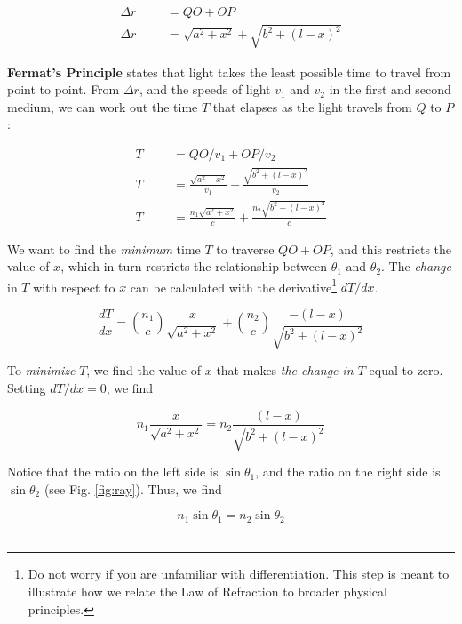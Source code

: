 \documentclass[12pt,twocolumn]{article}
\begin{document}
\begin{align}
\Delta r & & &= QO +OP \\
\Delta r & & &= \sqrt{a^2+x^2} + \sqrt{b^2 + (l-x)^2}
\end{align}

\textbf{Fermat's Principle} states that light takes the least possible time to travel from point to point.  From $\Delta r$, and the speeds of light $v_1$ and $v_2$ in the first and second medium, we can work out the time $T$ that elapses as the light travels from $Q$ to $P$:

\begin{align}
T & & &= QO/v_1 + OP/v_2 \\
T & & &= \frac{\sqrt{a^2+x^2}}{v_1} + \frac{\sqrt{b^2 + (l-x)^2}}{v_2} \\
T & & &= \frac{n_1\sqrt{a^2+x^2}}{c} + \frac{n_2\sqrt{b^2 + (l-x)^2}}{c} \label{eq:T}
\end{align}

We want to find the \textit{minimum} time $T$ to traverse $QO + OP$, and this restricts the value of $x$, which in turn restricts the relationship between $\theta_1$ and $\theta_2$.  The \textit{change} in $T$ with respect to $x$ can be calculated with the derivative\footnote{Do not worry if you are unfamiliar with differentiation.  This step is meant to illustrate how we relate the Law of Refraction to broader physical principles.} $dT/dx$.

\begin{equation}
\frac{dT}{dx} = \left(\frac{n_1}{c}\right) \frac{x}{\sqrt{a^2+x^2}} + \left(\frac{n_2}{c}\right) \frac{-(l-x)}{\sqrt{b^2 + (l-x)^2}}
\end{equation}

To \textit{minimize} $T$, we find the value of $x$ that makes \textit{the change in $T$} equal to zero.  Setting $dT/dx = 0$, we find

\begin{equation}
n_1 \frac{x}{\sqrt{a^2+x^2}} = n_2 \frac{(l-x)}{\sqrt{b^2 + (l-x)^2}}
\end{equation}

Notice that the ratio on the left side is $\sin\theta_1$, and the ratio on the right side is $\sin\theta_2$ (see Fig. \ref{fig:ray}).  Thus, we find

\begin{equation}
n_1 \sin\theta_1 = n_2 \sin\theta_2 \label{eq:sn2}
\end{equation} \\
\end{document}

